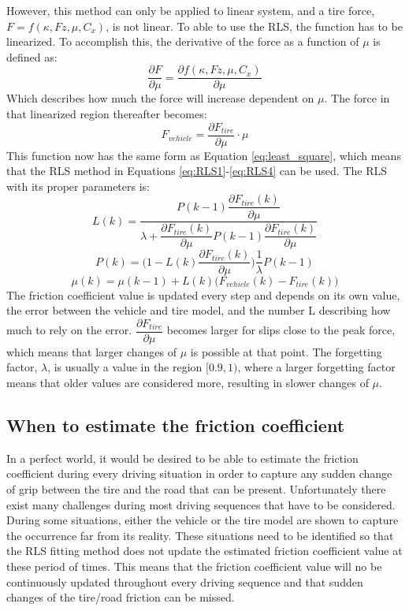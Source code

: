 However, this method can only be applied to linear system, and a tire force, $F=f(\kappa, Fz, \mu, C_{x})$, is not linear. To able to use the RLS, the function has to be linearized. To accomplish this, the derivative of the force as a function of $ \mu $ is defined as:
\begin{equation}
	\dfrac{\partial F}{\partial \mu} = \dfrac{\partial f(\kappa, Fz, \mu, C_{x})}{\partial \mu}
\end{equation}
Which describes how much the force will increase dependent on $ \mu $. The force in that linearized region thereafter becomes:
\begin{equation}
	F_{vehicle} = \dfrac{\partial F_{tire}}{\partial \mu} \cdot \mu
\end{equation}
This function now has the same form as Equation \ref{eq:least_square}, which means that the RLS method in Equations \ref{eq:RLS1}-\ref{eq:RLS4} can be used. The RLS with its proper parameters is:
\begin{equation}
	L(k) =\dfrac{ P(k-1) \dfrac{\partial F_{tire}(k)}{\partial \mu}}{\lambda + \dfrac{\partial F_{tire}(k)}{\partial \mu} P(k-1) \dfrac{\partial F_{tire}(k)}{\partial \mu}} 
\end{equation}
\begin{equation}
	P(k) = \Bigg( 1 - L(k) \dfrac{\partial F_{tire}(k)}{\partial \mu} \Bigg) \dfrac{1}{\lambda} P(k-1)
\end{equation}
\begin{equation}
	\mu (k) = \mu (k-1) + L(k) \Big( F_{vehicle} (k) - F_{tire} (k) \Big)
\end{equation}
The friction coefficient value is updated every step and depends on its own value, the error between the vehicle and tire model, and the number L describing how much to rely on the error. $ \dfrac{\partial F_{tire}}{\partial \mu} $ becomes larger for slips close to the peak force, which means that larger changes of $ \mu $ is possible at that point. The forgetting factor, $ \lambda $, is usually a value in the region $ [0.9, 1) $, where a larger forgetting factor means that older values are considered more, resulting in slower changes of $ \mu $.

\subsection{When to estimate the friction coefficient}
In a perfect world, it would be desired to be able to estimate the friction coefficient during every driving situation in order to capture any sudden change of grip between the tire and the road that can be present. Unfortunately there exist many challenges during most driving sequences that have to be considered. During some situations, either the vehicle or the tire model are shown to capture the occurrence far from its reality. These situations need to be identified so that the RLS fitting method does not update the estimated friction coefficient value at these period of times. This means that the friction coefficient value will no be continuously updated throughout every driving sequence and that sudden changes of the tire/road friction can be missed.

